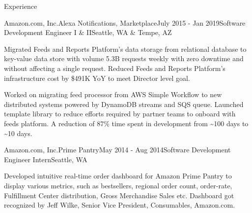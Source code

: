 \documentclass{resume} %
\begin{document}
\begin{rSection}{Experience}
\begin{rSubsection}{Amazon.com, Inc.}{Alexa Notifications, Marketplace}{July 2015 - Jan 2019}{Software Development Engineer I \& II}{Seattle, WA \& Tempe, AZ }
		\item Migrated Feeds and Reports Platform's data storage from relational database to key-value data store with volume 5.3B requests weekly with zero downtime and without affecting a single request. Reduced Feeds and Reports Platform's infrastructure cost by \$491K YoY to meet Director level goal.
		
		\item Worked on migrating feed processor from AWS Simple Workflow to new distributed systems powered by DynamoDB streams and SQS queue. Launched template library to reduce efforts required by partner teams to onboard with feeds platform. A reduction of 87\% time spent in development from \~{}100 days to \~{}10 days.

	\end{rSubsection}
	
	
	\begin{rSubsection}{Amazon.com, Inc.}{Prime Pantry}{May 2014 - Aug 2014}{Software Development Engineer Intern}{Seattle, WA}
		\item Developed intuitive real-time order dashboard for Amazon Prime Pantry to display various metrics, such as bestsellers, regional order count, order-rate, Fulfillment Center distribution, Gross Merchandise Sales etc. Dashboard got recognized by Jeff Wilke, Senior Vice President, Consumables, Amazon.com.
	\end{rSubsection}
	
	
\end{rSection}

\end{document}
